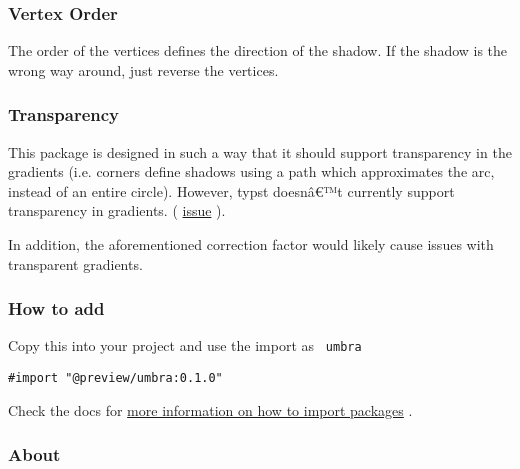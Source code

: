 \subsubsection{Vertex Order}\label{vertex-order}

The order of the vertices defines the direction of the shadow. If the
shadow is the wrong way around, just reverse the vertices.

\subsubsection{Transparency}\label{transparency}

This package is designed in such a way that it should support
transparency in the gradients (i.e. corners define shadows using a path
which approximates the arc, instead of an entire circle). However, typst
doesnâ€™t currently support transparency in gradients. (
\href{https://github.com/typst/typst/issues/2546}{issue} ).

In addition, the aforementioned correction factor would likely cause
issues with transparent gradients.

\subsubsection{How to add}\label{how-to-add}

Copy this into your project and use the import as \texttt{\ umbra\ }

\begin{verbatim}
#import "@preview/umbra:0.1.0"
\end{verbatim}



Check the docs for
\href{https://typst.app/docs/reference/scripting/\#packages}{more
information on how to import packages} .

\subsubsection{About}\label{about}

